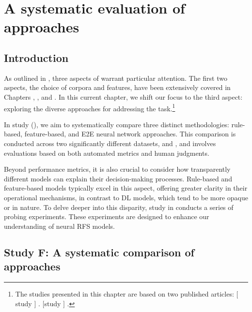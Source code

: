 \chapter{A systematic evaluation of \context approaches}\label{chap7}

\section{Introduction}

As outlined in , three aspects of \context warrant particular attention. The first two aspects, the choice of corpora and features, have been extensively covered in Chapters \4, \5, and \6. In this current chapter, we shift our focus to the third aspect: exploring the diverse approaches for addressing the \context task.\footnote{The studies presented in this chapter are based on two published articles: $[$study \studF$]$ . $[$study \studG$]$ .}

In study \studF (), we aim to systematically compare three distinct methodologies: rule-based, feature-based, and E2E neural network approaches. This comparison is conducted across two significantly different datasets, \webnlg and \wsj, and involves evaluations based on both automated metrics and human judgments.

Beyond performance metrics, it is also crucial to consider how transparently different models can explain their decision-making processes. Rule-based and feature-based models typically excel in this aspect, offering greater clarity in their operational mechanisms, in contrast to DL models, which tend to be more opaque or  in nature. To delve deeper into this disparity, study \studG in  conducts a series of probing experiments. These experiments are designed to enhance our understanding of neural \context RFS models.

\section{Study F: A systematic comparison of \context approaches}\label{sec:modelcomparison}

